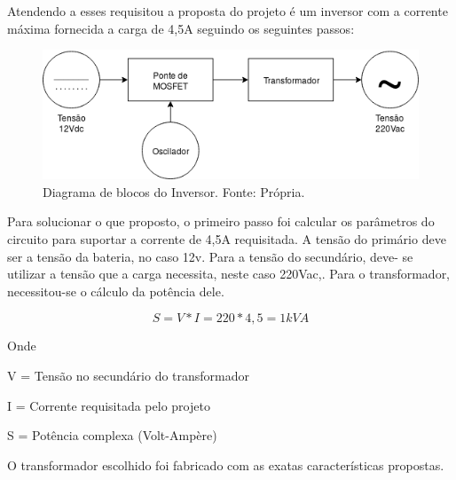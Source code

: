         Atendendo a esses requisitou a proposta do projeto é um inversor com a 							corrente máxima fornecida a carga de 4,5A seguindo os seguintes passos:
        
        \begin{figure}[!htb]
            \centering
            \includegraphics[scale= 0.4]{figuras/Diagrama_Inversor.png}
            \caption{Diagrama de blocos do Inversor. Fonte: Própria.}
            \label{diagrama-inversor}
        \end{figure} 
        Para solucionar o que proposto, o primeiro passo foi calcular os parâmetros do 				circuito para suportar a corrente de 4,5A requisitada. A tensão do primário 					deve ser a tensão da bateria, no caso 12v. Para a tensão do secundário, deve-					se utilizar a tensão que a carga necessita, neste caso 220Vac,. Para o 							transformador, necessitou-se o cálculo da potência dele.    
        
        \begin{equation}
            S = V*I = 220*4,5 = 1kVA
        \end{equation}
        
        Onde	
        
        V = Tensão no secundário do transformador
        
        I = Corrente requisitada pelo projeto

        S = Potência complexa (Volt-Ampère)
        
        O transformador escolhido foi fabricado com as exatas características 							propostas.		

